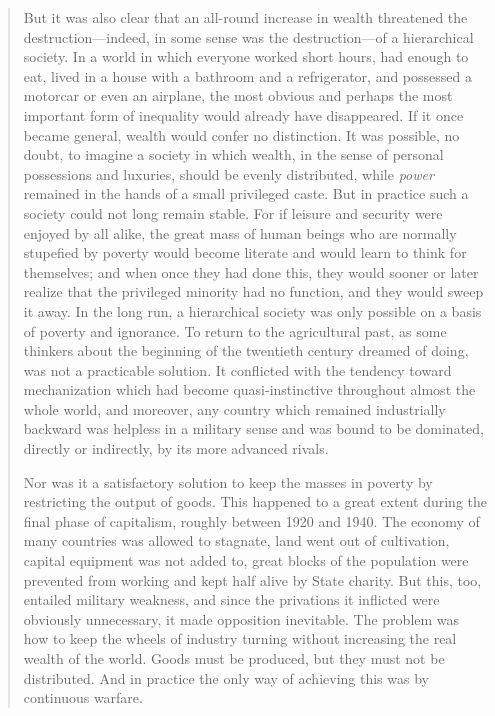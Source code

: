 \begin{quotation}
But it was also clear that an all-round increase in wealth threatened
the destruction---indeed, in some sense was the destruction---of a
hierarchical society. In a world in which everyone worked short hours,
had enough to eat, lived in a house with a bathroom and a refrigerator,
and possessed a motorcar or even an airplane, the most obvious and
perhaps the most important form of inequality would already have
disappeared. If it once became general, wealth would confer no
distinction. It was possible, no doubt, to imagine a society in which
wealth, in the sense of personal possessions and luxuries, should be
evenly distributed, while \emph{power} remained in the hands of a small
privileged caste. But in practice such a society could not long remain
stable. For if leisure and security were enjoyed by all alike, the great
mass of human beings who are normally stupefied by poverty would become
literate and would learn to think for themselves; and when once they had
done this, they would sooner or later realize that the privileged
minority had no function, and they would sweep it away. In the long run,
a hierarchical society was only possible on a basis of poverty and
ignorance. To return to the agricultural past, as some thinkers about
the beginning of the twentieth century dreamed of doing, was not a
practicable solution. It conflicted with the tendency toward
mechanization which had become quasi-instinctive throughout almost the
whole world, and moreover, any country which remained industrially
backward was helpless in a military sense and was bound to be dominated,
directly or indirectly, by its more advanced rivals.

Nor was it a satisfactory solution to keep the masses in poverty by
restricting the output of goods. This happened to a great extent during
the final phase of capitalism, roughly between 1920 and 1940. The
economy of many countries was allowed to stagnate, land went out of
cultivation, capital equipment was not added to, great blocks of the
population were prevented from working and kept half alive by State
charity. But this, too, entailed military weakness, and since the
privations it inflicted were obviously unnecessary, it made opposition
inevitable. The problem was how to keep the wheels of industry turning
without increasing the real wealth of the world. Goods must be produced,
but they must not be distributed. And in practice the only way of
achieving this was by continuous warfare.


\end{quotation}
